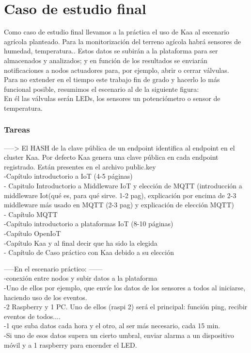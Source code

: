 \documentclass[12pt, twoside]{book}
\begin{document}
\section{Caso de estudio final}
Como caso de estudio final llevamos a la práctica el uso de Kaa al escenario agrícola planteado. Para la monitorización del terreno agícola habrá sensores de humedad, temperatura.. Estos datos se subirán a la plataforma para ser almacenados y analizados; y en función de los resultados se enviarán notificaciones a nodos actuadores para, por ejemplo, abrir o cerrar válvulas. \\
Para no extender en el tiempo este trabajo fin de grado y hacerlo lo más funcional posible, resumimos el escenario al de la siguiente figura:\\

En él las válvulas serán LEDs, los sensores un potenciómetro o sensor de temperatura. 
\subsubsection*{Tareas }
-----> El HASH de la clave pública de un endpoint identifica al endpoint en el cluster Kaa. Por defecto Kaa genera una clave pública en cada endpoint registrado. Están presentes en el archivo public.key\\


-Capítulo introductorio a IoT (4-5 páginas)\\
- Capitulo Introductorio a Middleware IoT y elección de MQTT (introducción a middleware Iot(qué es, para qué sirve. 1-2 pag), explicación por encima de 2-3 middleware más usado en MQTT (2-3 pag) y explicación de elección MQTT) \\
- Capítulo MQTT\\
-Capítulo introductorio a plataformas IoT (8-10 páginas)\\
-Capítulo OpenIoT\\
-Capítulo Kaa y al final decir que ha sido la elegida\\
- Capítulo de Caso práctico con Kaa debido a su elección


-----En el escenario práctico: ------\\
-conexión entre nodos y subir datos a la plataforma\\
-Uno de ellos por ejemplo, que envíe los datos de los sensores a todos al iniciarse, haciendo uso de los eventos.\\
-2 Raspberry y 1 PC. Uno de ellos (raspi 2) será el principal: función ping, recibir eventos de todos....\\
-1 que suba datos cada hora y el otro, al ser más necesario, cada 15 min.\\
-Si uno de esos datos supera un cierto umbral, enviar alarma a un dispositivo móvil y a 1 raspberry para encender el LED.
\end{document}
